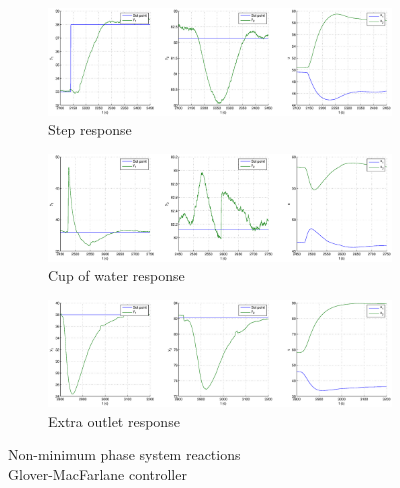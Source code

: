 \begin{figure}[h!t]
        \centering
        \begin{subfigure}[b]{\columnwidth}
                \includegraphics[width=\columnwidth]{fig/nonmin_glover_step.eps}
                \caption{Step response}
        \end{subfigure}
        \begin{subfigure}[b]{\columnwidth}
                \includegraphics[width=\columnwidth]{fig/nonmin_glover_gob.eps}
                \caption{Cup of water response}
        \end{subfigure}
        \begin{subfigure}[b]{\columnwidth}
                \includegraphics[width=\columnwidth]{fig/nonmin_glover_fui.eps}
                \caption{Extra outlet response}
        \end{subfigure}
        \caption{Non-minimum phase system reactions \\ Glover-MacFarlane controller}
        \label{nonmin_glover_fig}
\end{figure}

